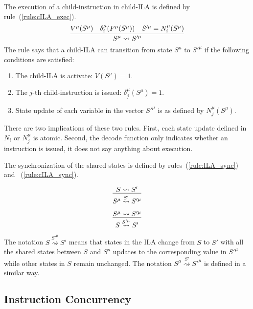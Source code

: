 The execution of a child-instruction in child-ILA is defined by 
rule~(\ref{rule:cILA_exec}).
\begin{equation}
  \infer{S^\mu \rightsquigarrow S'^\mu}
        {V^\mu(S^\mu) & \delta_i^\mu(F^\mu(S^\mu)) & S'^\mu = N_i^\mu(S^\mu)}
  \label{rule:cILA_exec}
\end{equation}
The rule says that a child-ILA can transition from state $S^\mu$ to $S'^\mu$ if 
the following conditions are satisfied:
\begin{enumerate}
  \item The child-ILA is activate: $V(S^\mu) = 1$.
  \item The $j$-th child-instruction is issued: $\delta_j^\mu(S^\mu) = 1$.
  \item State update of each variable in the vector $S'^\mu$ is as defined by 
        $N_j^\mu (S^\mu)$.
\end{enumerate}

There are two implications of these two rules.
First, each state update defined in $N_i$ or $N_j^\mu$ is atomic.
Second, the decode function only indicates whether an instruction is issued, it 
does not say anything about execution.

The synchronization of the shared states is defined by 
rules~(\ref{rule:ILA_sync}) and ~(\ref{rule:cILA_sync}).

\begin{equation}
  \infer{S^\mu \overset{S'}{\rightsquigarrow} S'^\mu}
        {S \rightsquigarrow S'}
  \label{rule:ILA_sync}
\end{equation}

\begin{equation}
  \infer{S \overset{S'^\mu}{\rightsquigarrow} S'}
        {S^\mu \rightsquigarrow S'^\mu}
  \label{rule:cILA_sync}
\end{equation}

The notation $S \overset{S'^\mu}{\rightsquigarrow} S'$ means that states in the 
ILA change from $S$ to $S'$ with all the shared states between $S$ and $S^\mu$
updates to the corresponding value in $S'^\mu$ while other states in $S$ remain 
unchanged.
The notation $S^\mu \overset{S'}{\rightsquigarrow} S'^\mu$ is defined in a 
similar way.

\subsection*{Instruction Concurrency}


